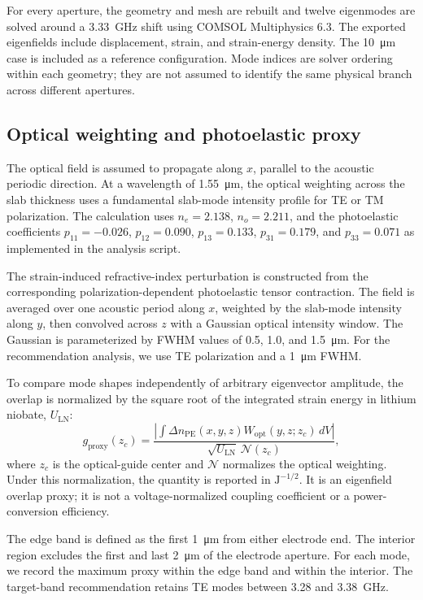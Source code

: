 \documentclass[10pt,twocolumn]{article}
\begin{document}
For every aperture, the geometry and mesh are rebuilt and twelve eigenmodes are solved around a \SI{3.33}{\giga\hertz} shift using COMSOL Multiphysics 6.3. The exported eigenfields include displacement, strain, and strain-energy density. The \SI{10}{\micro\meter} case is included as a reference configuration. Mode indices are solver ordering within each geometry; they are not assumed to identify the same physical branch across different apertures.
\subsection{Optical weighting and photoelastic proxy}
The optical field is assumed to propagate along $x$, parallel to the acoustic periodic direction. At a wavelength of \SI{1.55}{\micro\meter}, the optical weighting across the slab thickness uses a fundamental slab-mode intensity profile for TE or TM polarization. The calculation uses $n_e=2.138$, $n_o=2.211$, and the photoelastic coefficients $p_{11}=-0.026$, $p_{12}=0.090$, $p_{13}=0.133$, $p_{31}=0.179$, and $p_{33}=0.071$ as implemented in the analysis script.

The strain-induced refractive-index perturbation is constructed from the corresponding polarization-dependent photoelastic tensor contraction. The field is averaged over one acoustic period along $x$, weighted by the slab-mode intensity along $y$, then convolved across $z$ with a Gaussian optical intensity window. The Gaussian is parameterized by FWHM values of 0.5, 1.0, and \SI{1.5}{\micro\meter}. For the recommendation analysis, we use TE polarization and a \SI{1}{\micro\meter} FWHM.

To compare mode shapes independently of arbitrary eigenvector amplitude, the overlap is normalized by the square root of the integrated strain energy in lithium niobate, $U_{\mathrm{LN}}$:
\begin{equation}
g_{\mathrm{proxy}}(z_c)=\frac{\left|\int \Delta n_{\mathrm{PE}}(x,y,z)W_{\mathrm{opt}}(y,z;z_c)\,dV\right|}{\sqrt{U_{\mathrm{LN}}}\,\mathcal{N}(z_c)},
\end{equation}
where $z_c$ is the optical-guide center and $\mathcal{N}$ normalizes the optical weighting. Under this normalization, the quantity is reported in $\mathrm{J}^{-1/2}$. It is an eigenfield overlap proxy; it is not a voltage-normalized coupling coefficient or a power-conversion efficiency.

The edge band is defined as the first \SI{1}{\micro\meter} from either electrode end. The interior region excludes the first and last \SI{2}{\micro\meter} of the electrode aperture. For each mode, we record the maximum proxy within the edge band and within the interior. The target-band recommendation retains TE modes between 3.28 and \SI{3.38}{\giga\hertz}.
\end{document}
